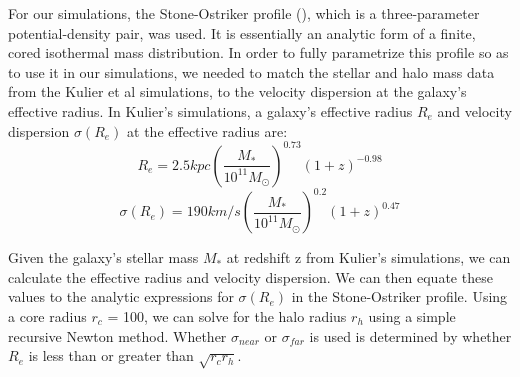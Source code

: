 \documentclass[english, apj]{emulateapj}
\begin{document}
For our simulations, the Stone-Ostriker profile (\citet{2015ApJ...806L..28S}), which is a three-parameter potential-density pair, was used.  It is essentially an analytic form of a finite, cored isothermal mass distribution.  In order to fully parametrize this profile so as to use it in our simulations, we needed to match the stellar and halo mass data from the Kulier et al simulations, to the velocity dispersion at the galaxy's effective radius.  In Kulier's simulations, a galaxy's effective radius $R_{e}$ and velocity dispersion $\sigma(R_e)$ at the effective radius are:
\begin{equation} \label{re}
R_{e} = 2.5 kpc\left(\frac{M_*}{10^{11}M_{\odot}}\right)^{0.73}(1+z)^{-0.98}
\end{equation}
\begin{equation} \label{sig}
\sigma(R_{e}) = 190km/s\left(\frac{M_{*}}{10^{11}M_{\odot}}\right)^{0.2}(1+z)^{0.47}
\end{equation}

Given the galaxy's stellar mass $M_{*}$ at redshift z from Kulier's simulations, we can calculate the effective radius and velocity dispersion.  We can then equate these values to the analytic expressions for $\sigma(R_{e})$ in the Stone-Ostriker profile.  Using a core radius $r_c$ = 100, we can solve for the halo radius $r_h$ using a simple recursive Newton method.  Whether $\sigma_{near}$ or $\sigma_{far}$ is used is determined by whether $R_e$ is less than or greater than $\sqrt{r_c r_h}$.
\end{document}
